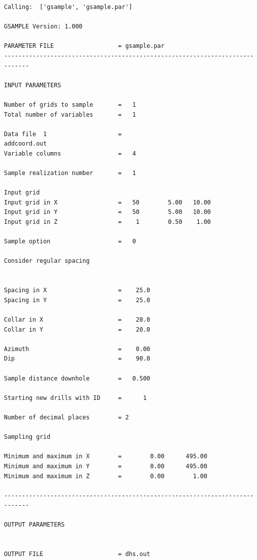 \documentclass[11pt]{article}
\begin{document}
    \begin{Verbatim}[commandchars=\\\{\}]
Calling:  ['gsample', 'gsample.par']

GSAMPLE Version: 1.000

PARAMETER FILE                  = gsample.par                                                                                                                                                                                                                                                     
-----------------------------------------------------------------------------

INPUT PARAMETERS 

Number of grids to sample       =   1
Total number of variables       =   1
 
Data file  1                    = 
addcoord.out
Variable columns                =   4
 
Sample realization number       =   1
 
Input grid 
Input grid in X                 =   50        5.00   10.00
Input grid in Y                 =   50        5.00   10.00
Input grid in Z                 =    1        0.50    1.00
 
Sample option                   =   0
 
Consider regular spacing 

 
Spacing in X                    =    25.0    
Spacing in Y                    =    25.0    
 
Collar in X                     =    20.0    
Collar in Y                     =    20.0    
 
Azimuth                         =    0.00    
Dip                             =    90.0    
 
Sample distance downhole        =   0.500    
 
Starting new drills with ID     =      1
 
Number of decimal places        = 2
 
Sampling grid 
 
Minimum and maximum in X        =        0.00      495.00
Minimum and maximum in Y        =        0.00      495.00
Minimum and maximum in Z        =        0.00        1.00
 
-----------------------------------------------------------------------------

OUTPUT PARAMETERS 

 
OUTPUT FILE                     = dhs.out                                                     
 

\end{Verbatim}
\end{document}
